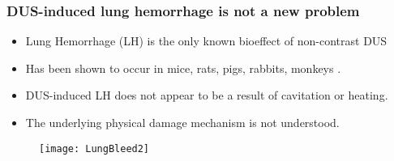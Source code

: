 \begin{frame} \frametitle{\vspace*{0.5cm}DUS-induced lung hemorrhage is not a new problem}
  {\small%
    \begin{itemize}%
    \item Lung Hemorrhage (LH) is the only known bioeffect of non-contrast DUS%
    \item Has been shown to occur in mice, rats, pigs, rabbits, monkeys \citep{Child1990,OBrien1997a,Tarantal1994a}.%
    \item DUS-induced LH does not appear to be a result of cavitation or heating.%
    \item The underlying physical damage mechanism is not understood.%
    \end{itemize}%
    \begin{figure}%
      \centering%
      \texttt{[image: LungBleed2]} \nocite{Miller2012}%
    \end{figure}%
  }
\end{frame}

